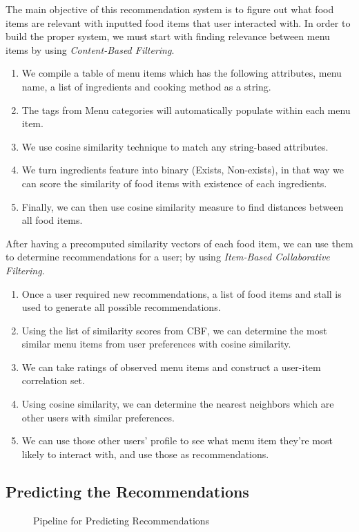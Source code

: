 The main objective of this recommendation system is to figure out what food items are relevant with inputted food items that user interacted with.
In order to build the proper system, we must start with finding relevance between menu items by using \textit{Content-Based Filtering}.

\begin{enumerate}[leftmargin=80pt]
    \item We compile a table of menu items which has the following attributes, menu name, a list of ingredients and cooking method as a string.
    \item The tags from Menu categories will automatically populate within each menu item.
    \item We use cosine similarity technique to match any string-based attributes.
    \item We turn ingredients feature into binary (Exists, Non-exists), in that way we can score the similarity of food items with existence of each ingredients.
    \item Finally, we can then use cosine similarity measure to find distances between all food items.
\end{enumerate}

After having a precomputed similarity vectors of each food item, we can use them to determine recommendations for a user;
by using \textit{Item-Based Collaborative Filtering}.

\begin{enumerate}[leftmargin=80pt]
    \item Once a user required new recommendations, a list of food items and stall is used to generate all possible recommendations.
    \item Using the list of similarity scores from CBF, we can determine the most similar menu items from user preferences with cosine similarity.
    \item We can take ratings of observed menu items and construct a user-item correlation set.
    \item Using cosine similarity, we can determine the nearest neighbors which are other users with similar preferences.
    \item We can use those other users' profile to see what menu item they're most likely to interact with, and use those as recommendations.
\end{enumerate}

\subsection{Predicting the Recommendations}
\begin{figure}[h!]
    \centering
    \caption{Pipeline for Predicting Recommendations}
    \label{fig:pipeline-for-predicting}
\end{figure}

